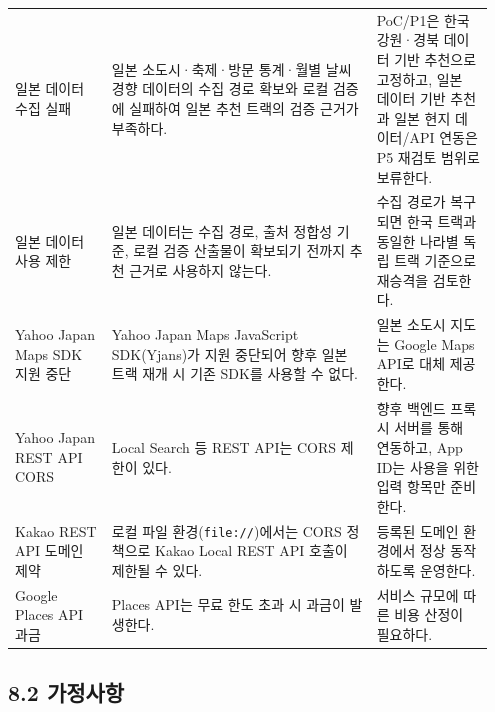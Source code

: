 \documentclass[12pt,a4paper]{article}
\newcommand{\DocNeedspace}[1]{\par\ifdim\dimexpr\pagegoal-\pagetotal\relax<#1\newpage\fi}
\renewcommand{\arraystretch}{1.35}
\begin{document}
\DocNeedspace{22\baselineskip}
\begin{small}
\setlength{\tabcolsep}{3pt}
\setlength{\extrarowheight}{1pt}
\renewcommand{\arraystretch}{1.46}
\begin{longtable}{@{}>{\centering\arraybackslash}m{0.190\linewidth}>{\RaggedRight\arraybackslash}m{0.520\linewidth}>{\RaggedRight\arraybackslash}m{0.238\linewidth}@{}}
\toprule
\multicolumn{1}{>{\centering\arraybackslash}m{0.190\linewidth}}{\textbf{제약 항목}} & \multicolumn{1}{>{\centering\arraybackslash}m{0.520\linewidth}}{\textbf{주요 내용}} & \multicolumn{1}{>{\centering\arraybackslash}m{0.238\linewidth}}{\textbf{적용 방향}} \\
\midrule
\endhead
일본 데이터 수집 실패 & 일본 소도시·축제·방문 통계·월별 날씨 경향 데이터의 수집 경로 확보와 로컬 검증에 실패하여 일본 추천 트랙의 검증 근거가 부족하다. & PoC/P1은 한국 강원·경북 데이터 기반 추천으로 고정하고, 일본 데이터 기반 추천과 일본 현지 데이터/API 연동은 P5 재검토 범위로 보류한다. \\
일본 데이터 사용 제한 & 일본 데이터는 수집 경로, 출처 정합성 기준, 로컬 검증 산출물이 확보되기 전까지 추천 근거로 사용하지 않는다. & 수집 경로가 복구되면 한국 트랙과 동일한 나라별 독립 트랙 기준으로 재승격을 검토한다. \\
Yahoo Japan Maps SDK 지원 중단 & Yahoo Japan Maps JavaScript SDK(Yjans)가 지원 중단되어 향후 일본 트랙 재개 시 기존 SDK를 사용할 수 없다. & 일본 소도시 지도는 Google Maps API로 대체 제공한다. \\
Yahoo Japan REST API CORS & Local Search 등 REST API는 CORS 제한이 있다. & 향후 백엔드 프록시 서버를 통해 연동하고, App ID는 사용을 위한 입력 항목만 준비한다. \\
Kakao REST API 도메인 제약 & 로컬 파일 환경(\texttt{file:\allowbreak{}/\allowbreak{}/\allowbreak{}})에서는 CORS 정책으로 Kakao Local REST API 호출이 제한될 수 있다. & 등록된 도메인 환경에서 정상 동작하도록 운영한다. \\
Google Places API 과금 & Places API는 무료 한도 초과 시 과금이 발생한다. & 서비스 규모에 따른 비용 산정이 필요하다. \\
\bottomrule
\end{longtable}
\end{small}


\DocNeedspace{24\baselineskip}
\subsection*{8.2 가정사항}
\end{document}
